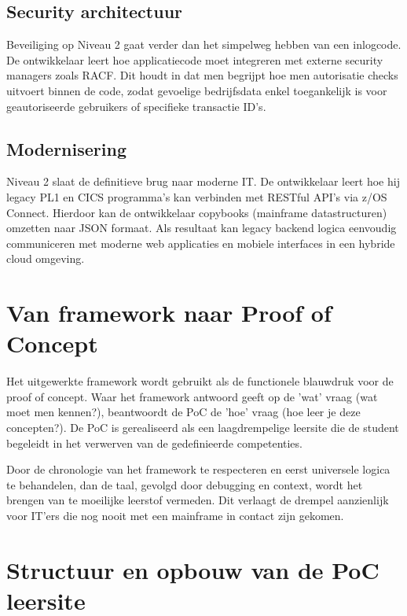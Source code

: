 \subsection{Security architectuur}
\label{sec:security-architectuur}
Beveiliging op Niveau 2 gaat verder dan het simpelweg hebben van een inlogcode.
De ontwikkelaar leert hoe applicatiecode moet integreren met externe security managers zoals RACF.
Dit houdt in dat men begrijpt hoe men autorisatie checks uitvoert binnen de code, zodat gevoelige bedrijfsdata enkel toegankelijk is voor geautoriseerde gebruikers of specifieke transactie ID's.

\subsection{Modernisering}
\label{sec:modernisering-api-integratie}
Niveau 2 slaat de definitieve brug naar moderne IT.
De ontwikkelaar leert hoe hij legacy PL1 en CICS programma's kan verbinden met RESTful API's via z/OS Connect.
Hierdoor kan de ontwikkelaar copybooks (mainframe datastructuren) omzetten naar JSON formaat.
Als resultaat kan legacy backend logica eenvoudig communiceren met moderne web applicaties en mobiele interfaces in een hybride cloud omgeving.


\section{Van framework naar Proof of Concept}
\label{sec:van-framework-naar-proof-of-concept}

Het uitgewerkte framework wordt gebruikt als de functionele blauwdruk voor de proof of concept.
Waar het framework antwoord geeft op de 'wat' vraag (wat moet men kennen?), beantwoordt de PoC de 'hoe' vraag (hoe leer je deze concepten?).
De PoC is gerealiseerd als een laagdrempelige leersite die de student begeleidt in het verwerven van de gedefinieerde competenties.

Door de chronologie van het framework te respecteren en eerst universele logica te behandelen, dan de taal, gevolgd door debugging en context, wordt het brengen van te moeilijke leerstof vermeden.
Dit verlaagt de drempel aanzienlijk voor IT'ers die nog nooit met een mainframe in contact zijn gekomen.

\section{Structuur en opbouw van de PoC leersite}%
\label{sec:opbouw-van-de-leersite}



